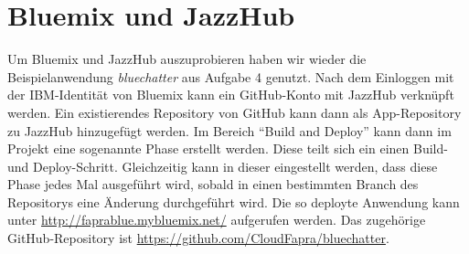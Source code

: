 \section{Bluemix und JazzHub}

Um Bluemix und JazzHub auszuprobieren haben wir wieder die Beispielanwendung \emph{bluechatter} aus Aufgabe 4 genutzt. Nach dem Einloggen mit der IBM-Identität von Bluemix kann ein GitHub-Konto mit JazzHub verknüpft werden. Ein existierendes Repository von GitHub kann dann als App-Repository zu JazzHub hinzugefügt werden. Im Bereich \enquote{Build and Deploy} kann dann im Projekt eine sogenannte Phase erstellt werden. Diese teilt sich ein einen Build- und Deploy-Schritt. Gleichzeitig kann in dieser eingestellt werden, dass diese Phase jedes Mal ausgeführt wird, sobald in einen bestimmten Branch des Repositorys eine Änderung durchgeführt wird. Die so deployte Anwendung kann unter \url{http://faprablue.mybluemix.net/} aufgerufen werden. Das zugehörige GitHub-Repository ist \url{https://github.com/CloudFapra/bluechatter}.